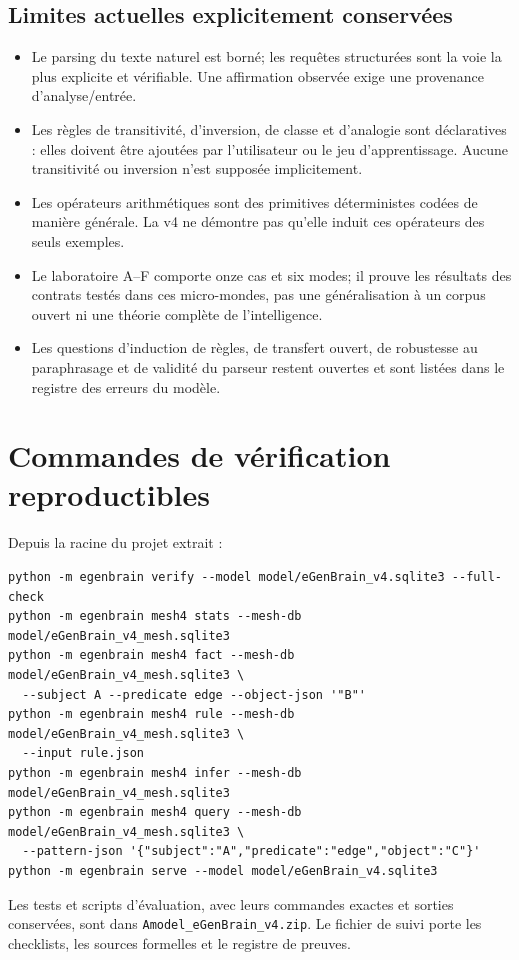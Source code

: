 \documentclass[11pt,a4paper]{book}
\begin{document}
\section{Limites actuelles explicitement conservées}
\begin{itemize}
\item Le parsing du texte naturel est borné; les requêtes structurées sont la voie la plus explicite et vérifiable. Une affirmation observée exige une provenance d'analyse/entrée.
\item Les règles de transitivité, d'inversion, de classe et d'analogie sont déclaratives : elles doivent être ajoutées par l'utilisateur ou le jeu d'apprentissage. Aucune transitivité ou inversion n'est supposée implicitement.
\item Les opérateurs arithmétiques sont des primitives déterministes codées de manière générale. La v4 ne démontre pas qu'elle induit ces opérateurs des seuls exemples.
\item Le laboratoire A--F comporte onze cas et six modes; il prouve les résultats des contrats testés dans ces micro-mondes, pas une généralisation à un corpus ouvert ni une théorie complète de l'intelligence.
\item Les questions d'induction de règles, de transfert ouvert, de robustesse au paraphrasage et de validité du parseur restent ouvertes et sont listées dans le registre des erreurs du modèle.
\end{itemize}

\chapter{Commandes de vérification reproductibles}
Depuis la racine du projet extrait :
\begin{verbatim}
python -m egenbrain verify --model model/eGenBrain_v4.sqlite3 --full-check
python -m egenbrain mesh4 stats --mesh-db model/eGenBrain_v4_mesh.sqlite3
python -m egenbrain mesh4 fact --mesh-db model/eGenBrain_v4_mesh.sqlite3 \
  --subject A --predicate edge --object-json '"B"'
python -m egenbrain mesh4 rule --mesh-db model/eGenBrain_v4_mesh.sqlite3 \
  --input rule.json
python -m egenbrain mesh4 infer --mesh-db model/eGenBrain_v4_mesh.sqlite3
python -m egenbrain mesh4 query --mesh-db model/eGenBrain_v4_mesh.sqlite3 \
  --pattern-json '{"subject":"A","predicate":"edge","object":"C"}'
python -m egenbrain serve --model model/eGenBrain_v4.sqlite3
\end{verbatim}
Les tests et scripts d'évaluation, avec leurs commandes exactes et sorties conservées, sont dans \texttt{Amodel\_eGenBrain\_v4.zip}. Le fichier de suivi porte les checklists, les sources formelles et le registre de preuves.
\end{document}
